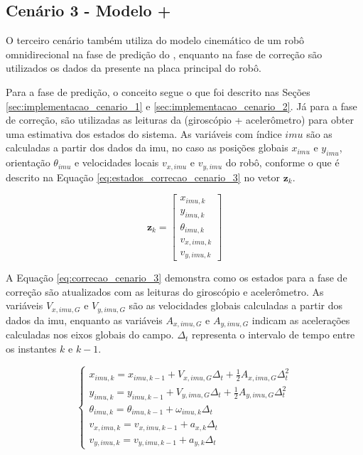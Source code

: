 \documentclass[acronym, symbols, table, deposito]{fei}
\begin{document}
		\subsection{Cenário 3 - Modelo + } \label{sec:implementacao_cenario_3}
		
			O terceiro cenário também utiliza do modelo cinemático de um robô omnidirecional na fase de predição do , enquanto na fase de correção são utilizados os dados da  presente na placa principal do robô.
			
			Para a fase de predição, o conceito segue o que foi descrito nas Seções \ref{sec:implementacao_cenario_1} e \ref{sec:implementacao_cenario_2}. Já para a fase de correção, são utilizadas as leituras da  (giroscópio + acelerômetro) para obter uma estimativa dos estados do sistema. As variáveis com índice $imu$ são as calculadas a partir dos dados da \acrshort{imu}, no caso as posições globais $x_{imu}$ e $y_{imu}$, orientação $\theta_{imu}$ e velocidades locais $v_{x,imu}$ e $v_{y,imu}$ do robô, conforme o que é descrito na Equação \eqref{eq:estados_correcao_cenario_3} no vetor $\textbf{z}_k$.
			
	 		\begin{equation}\label{eq:estados_correcao_cenario_3}
				\textbf{z}_k  = 
				\begin{bmatrix}
					x_{imu,k} \\
					y_{imu,k} \\
					\theta_{imu,k} \\
					v_{x,imu,k} \\
					v_{y,imu,k}
				\end{bmatrix}
			\end{equation}
		
			A Equação \eqref{eq:correcao_cenario_3} demonstra como os estados para a fase de correção são atualizados com as leituras do giroscópio e acelerômetro. As variáveis $V_{x,imu,G}$ e $V_{y,imu,G}$ são as velocidades globais calculadas a partir dos dados da \acrshort{imu}, enquanto as variáveis $A_{x,imu,G}$ e $A_{y,imu,G}$ indicam as acelerações calculadas nos eixos globais do campo. $\Delta_t$ representa o intervalo de tempo entre os instantes $k$ e $k-1$.
			
			\begin{equation}\label{eq:correcao_cenario_3}
				\begin{cases}
					x_{imu,k} = x_{imu, k-1} + V_{x,imu,G} \Delta_t + \frac{1}{2}A_{x,imu,G} \Delta_t^2 \\
					y_{imu,k} = y_{imu, k-1} + V_{y,imu,G} \Delta_t + \frac{1}{2}A_{y,imu,G} \Delta_t^2 \\
					\theta_{imu,k} = \theta_{imu, k-1} + \omega_{imu,k} \Delta_t \\
					v_{x,imu,k} = v_{x,imu,k-1} + a_{x,k} \Delta_t\\
					v_{y,imu,k} = v_{y,imu,k-1} + a_{y,k} \Delta_t
				\end{cases}
			\end{equation}
		
\end{document}
